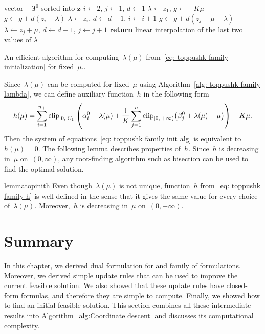 \begin{algorithm}
  \centering
  \begin{algorithmic}[1]
    \Require vector $-\bm{\beta}^0$ sorted into $\bm{z}$
    \State $i \gets 2$, $j \gets 1$, $d \gets 1$
    \State $\lambda \gets z_1$, $g \gets - K\mu$
        \State $g \gets g + d(z_i - \lambda)$
        \State $\lambda\gets z_i$, $d \gets d+1$, $i \gets i+1$
      \Else
        \State $g \gets g + d(z_j + \mu - \lambda)$
        \State $\lambda \gets z_j + \mu$, $d \gets d - 1$, $j \gets j + 1$
      \EndIf
    \EndWhile
    \State \textbf{return} linear interpolation of the last two values of $\lambda$
  \end{algorithmic}
  \caption{An efficient algorithm for computing~$\lambda(\mu)$ from~\eqref{eq: toppushk family initialization} for fixed~$\mu.$.}
  \label{alg: toppushk family lambda}
\end{algorithm}

Since~$\lambda(\mu)$ can be computed for fixed~$\mu$ using Algorithm~\ref{alg: toppushk family lambda}, we can define auxiliary function~$h$ in the following form
\begin{equation}\label{eq: toppushk family h}
  h(\mu)
    = \sum_{i=1}^{\npos} \clip{0}{C_1}{\alpha_i^0 - \lambda(\mu) + \frac{1}{K} \sum_{j=1}^{\ntil} \clip[u]{0}{+\infty}{\beta_j^0+\lambda(\mu) - \mu}} - K \mu.
\end{equation}
Then the system of equations~\eqref{eq: toppushk family init alg} is equivalent to~$h(\mu) = 0.$ The following lemma describes properties of~$h.$ Since~$h$ is decreasing in~$\mu$ on~$(0, \infty)$, any root-finding algorithm such as bisection can be used to find the optimal solution.

\begin{restatable}{lemma}{topinith}\label{lemma: toppushk family h}
  Even though~$\lambda(\mu)$ is not unique, function~$h$ from~\eqref{eq: toppushk family h} is well-defined in the sense that it gives the same value for every choice of~$\lambda(\mu)$. Moreover,~$h$ is decreasing in~$\mu$ on~$(0, + \infty)$.
\end{restatable}

\section{Summary}

In this chapter, we derived dual formulation for \TopPushK and \PatMat family of formulations. Moreover, we derived simple update rules that can be used to improve the current feasible solution. We also showed that these update rules have closed-form formulas, and therefore they are simple to compute. Finally, we showed how to find an initial feasible solution. This section combines all these intermediate results into Algorithm~\ref{alg:Coordinate descent} and discusses its computational complexity.

